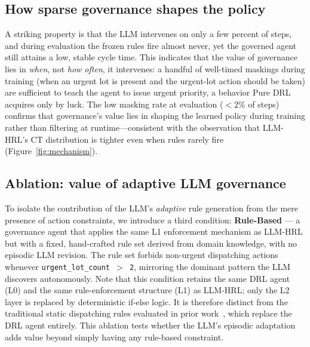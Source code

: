 \documentclass[10pt]{article}
\begin{document}
\subsection{How sparse governance shapes the policy}
A striking property is that the LLM intervenes on only a few percent of steps,
and during evaluation the frozen rules fire almost never, yet the governed agent
still attains a low, stable cycle time. This indicates that the value of
governance lies in \emph{when}, not \emph{how often}, it intervenes: a handful of
well-timed maskings during training (when an urgent lot is present and the urgent-lot action
should be taken) are sufficient to teach the agent to issue urgent priority,
a behavior Pure DRL acquires only by luck. The low masking rate at evaluation
($<$2\% of steps) confirms that governance's value lies in shaping the learned
policy during training rather than filtering at runtime---consistent with the
observation that LLM-HRL's CT distribution is tighter even when rules rarely
fire (Figure~\ref{fig:mechanism}).

\subsection{Ablation: value of adaptive LLM governance}
\label{sec:ablation}

To isolate the contribution of the LLM's \emph{adaptive} rule generation from
the mere presence of action constraints, we introduce a third condition:
\textbf{Rule-Based} --- a governance agent that applies the same L1 enforcement
mechanism as LLM-HRL but with a fixed, hand-crafted rule set derived from
domain knowledge, with no episodic LLM revision.
The rule set forbids non-urgent dispatching actions whenever
\texttt{urgent\_lot\_count\,$>$\,2}, mirroring the dominant pattern
the LLM discovers autonomously.
Note that this condition retains the same DRL agent (L0) and the same
rule-enforcement structure (L1) as LLM-HRL; only the L2 layer is replaced
by deterministic if-else logic. It is therefore distinct from the traditional
static dispatching rules evaluated in prior work~\parencite{lee2025}, which replace
the DRL agent entirely.
This ablation tests whether the LLM's episodic adaptation adds value beyond
simply having any rule-based constraint.
\end{document}
